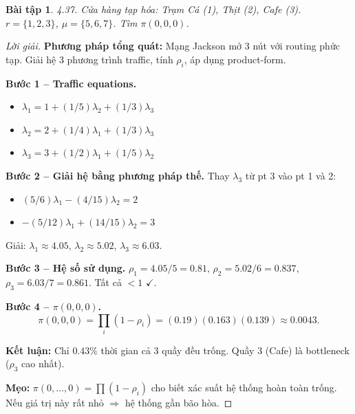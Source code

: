 \documentclass[8pt,a4paper]{article}
\newtheorem{exercise}{Bài tập}
\newenvironment{solution}{\begin{proof}[Lời giải]}{\end{proof}}
\begin{document}
\begin{exercise}
4.37. Cửa hàng tạp hóa: Trạm Cá (1), Thịt (2), Cafe (3). $r=\{1, 2, 3\}$, $\mu=\{5, 6, 7\}$. Tìm $\pi(0,0,0)$.
\end{exercise}
\begin{solution}
\textbf{Phương pháp tổng quát:} Mạng Jackson mở 3 nút với routing phức tạp. Giải hệ 3 phương trình traffic, tính $\rho_i$, áp dụng product-form.

\textbf{Bước 1 -- Traffic equations.}
\begin{itemize}[nosep]
\item $\lambda_1 = 1 + (1/5)\lambda_2 + (1/3)\lambda_3$
\item $\lambda_2 = 2 + (1/4)\lambda_1 + (1/3)\lambda_3$
\item $\lambda_3 = 3 + (1/2)\lambda_1 + (1/5)\lambda_2$
\end{itemize}

\textbf{Bước 2 -- Giải hệ bằng phương pháp thế.} Thay $\lambda_3$ từ pt 3 vào pt 1 và 2:
\begin{itemize}[nosep]
\item $(5/6)\lambda_1 - (4/15)\lambda_2 = 2$
\item $-(5/12)\lambda_1 + (14/15)\lambda_2 = 3$
\end{itemize}
Giải: $\lambda_1 \approx 4.05$, $\lambda_2 \approx 5.02$, $\lambda_3 \approx 6.03$.

\textbf{Bước 3 -- Hệ số sử dụng.}
$\rho_1 = 4.05/5 = 0.81$, $\rho_2 = 5.02/6 = 0.837$, $\rho_3 = 6.03/7 = 0.861$. Tất cả $< 1$ $\checkmark$.

\textbf{Bước 4 -- $\pi(0,0,0)$.}
\[
\pi(0,0,0) = \prod_i (1-\rho_i) = (0.19)(0.163)(0.139) \approx \boxed{0.0043}.
\]

\textbf{Kết luận:} Chỉ $0.43\%$ thời gian cả 3 quầy đều trống. Quầy 3 (Cafe) là bottleneck ($\rho_3$ cao nhất).

\textbf{Mẹo:} $\pi(0,\dots,0) = \prod(1-\rho_i)$ cho biết xác suất hệ thống hoàn toàn trống. Nếu giá trị này rất nhỏ $\Rightarrow$ hệ thống gần bão hòa.
\end{solution}
\end{document}
